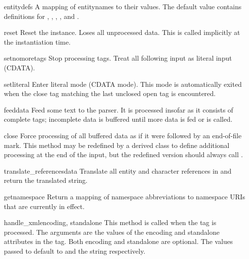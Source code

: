 \begin{memberdesc}{entitydefs}
A mapping of entitynames to their values.  The default value contains
definitions for , , , , 
and .
\end{memberdesc}

\begin{methoddesc}{reset}{}
Reset the instance.  Loses all unprocessed data.  This is called
implicitly at the instantiation time.
\end{methoddesc}

\begin{methoddesc}{setnomoretags}{}
Stop processing tags.  Treat all following input as literal input
(CDATA).
\end{methoddesc}

\begin{methoddesc}{setliteral}{}
Enter literal mode (CDATA mode).  This mode is automatically exited
when the close tag matching the last unclosed open tag is encountered.
\end{methoddesc}

\begin{methoddesc}{feed}{data}
Feed some text to the parser.  It is processed insofar as it consists
of complete tags; incomplete data is buffered until more data is
fed or  is called.
\end{methoddesc}

\begin{methoddesc}{close}{}
Force processing of all buffered data as if it were followed by an
end-of-file mark.  This method may be redefined by a derived class to
define additional processing at the end of the input, but the
redefined version should always call .
\end{methoddesc}

\begin{methoddesc}{translate_references}{data}
Translate all entity and character references in  and
return the translated string.
\end{methoddesc}

\begin{methoddesc}{getnamespace}{}
Return a mapping of namespace abbreviations to namespace URIs that are
currently in effect.
\end{methoddesc}

\begin{methoddesc}{handle_xml}{encoding, standalone}
This method is called when the  tag is processed.
The arguments are the values of the encoding and standalone attributes 
in the tag.  Both encoding and standalone are optional.  The values
passed to  default to  and the string
 respectively.
\end{methoddesc}

